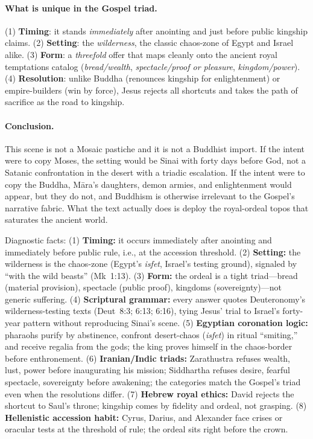 \paragraph*{What is unique in the Gospel triad.}
(1) \textbf{Timing}: it stands \emph{immediately} after anointing and just before public kingship claims.
(2) \textbf{Setting}: the \emph{wilderness}, the classic chaos-zone of Egypt and Israel alike.
(3) \textbf{Form}: a \emph{threefold} offer that maps cleanly onto the ancient royal temptations catalog (\emph{bread/wealth}, \emph{spectacle/proof or pleasure}, \emph{kingdom/power}).
(4) \textbf{Resolution}: unlike Buddha (renounces kingship for enlightenment) or empire-builders (win by force), Jesus rejects all shortcuts and takes the path of sacrifice as the road to kingship.

\paragraph*{Conclusion.}
This scene is not a Mosaic pastiche and it is not a Buddhist import.
If the intent were to copy Moses, the setting would be Sinai with forty days before God, not a Satanic confrontation in the desert with a triadic escalation.
If the intent were to copy the Buddha, Māra’s daughters, demon armies, and enlightenment would appear, but they do not, and Buddhism is otherwise irrelevant to the Gospel’s narrative fabric.
What the text actually does is deploy the royal-ordeal topos that saturates the ancient world.

Diagnostic facts:
(1) \textbf{Timing:} it occurs immediately after anointing and immediately before public rule, i.e., at the accession threshold.
(2) \textbf{Setting:} the wilderness is the chaos-zone (Egypt’s \emph{isfet}, Israel’s testing ground), signaled by “with the wild beasts” (Mk~1:13).
(3) \textbf{Form:} the ordeal is a tight triad---bread (material provision), spectacle (public proof), kingdoms (sovereignty)---not generic suffering.
(4) \textbf{Scriptural grammar:} every answer quotes Deuteronomy’s wilderness-testing texts (Deut~8:3; 6:13; 6:16), tying Jesus’ trial to Israel’s forty-year pattern without reproducing Sinai’s scene.
(5) \textbf{Egyptian coronation logic:} pharaohs purify by abstinence, confront desert-chaos (\emph{isfet}) in ritual “smiting,” and receive regalia from the gods; the king proves himself in the chaos-border before enthronement.
(6) \textbf{Iranian/Indic triads:} Zarathustra refuses wealth, lust, power before inaugurating his mission; Siddhartha refuses desire, fearful spectacle, sovereignty before awakening; the categories match the Gospel’s triad even when the resolutions differ.
(7) \textbf{Hebrew royal ethics:} David rejects the shortcut to Saul’s throne; kingship comes by fidelity and ordeal, not grasping.
(8) \textbf{Hellenistic accession habit:} Cyrus, Darius, and Alexander face crises or oracular tests at the threshold of rule; the ordeal sits right before the crown.

